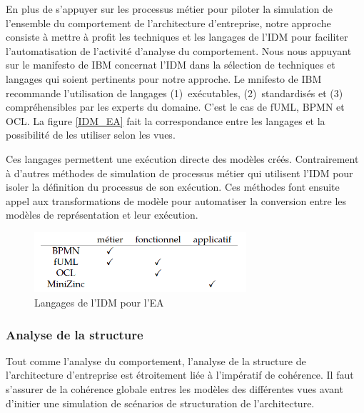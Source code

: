 En plus de s'appuyer sur les processus métier pour piloter la simulation de l'ensemble du comportement de l'architecture d'entreprise, notre approche consiste à mettre à profit les techniques et les langages de l'IDM pour faciliter l'automatisation de l'activité d'analyse du comportement. Nous nous appuyant sur le manifesto de IBM \cite{chesbrough2006research} concernat l'IDM dans la sélection de techniques et langages qui soient pertinents pour notre approche. Le mnifesto de IBM recommande l'utilisation de langages (1)~exécutables, (2)~standardisés et (3) compréhensibles par les experts du domaine. C'est le cas de fUML, BPMN et OCL. La figure \ref{IDM_EA} fait la correspondance entre les langages et la possibilité de les utiliser selon les vues. 

Ces langages permettent une exécution directe des modèles créés. Contrairement à d'autres méthodes de simulation de processus métier qui utilisent l'IDM pour isoler la définition du processus de son exécution. Ces méthodes font ensuite appel aux transformations de modèle pour automatiser la conversion entre les modèles de représentation et leur exécution. 



\begin{figure}[!htbp]
 \begin{center}
  \includegraphics[width=0.7\textwidth]{images/demarche/langages_vues.png}
 \end{center}
 \caption{Langages de l'IDM pour l'EA}
 \label{fig:IDM_EA}
\end{figure}


\subsubsection{Analyse de la structure}
Tout comme l'analyse du comportement, l'analyse de la structure de l'architecture d'entreprise est étroitement liée à l'impératif de cohérence.  Il faut s'assurer de la cohérence globale entres les modèles des différentes vues avant d'initier une simulation de scénarios de structuration de l'architecture. 

